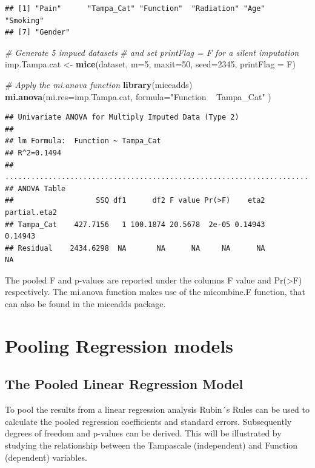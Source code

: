 \documentclass[]{book}
\newenvironment{Shaded}{\begin{snugshade}}{\end{snugshade}}
\newcommand{\KeywordTok}[1]{\textcolor[rgb]{0.13,0.29,0.53}{\textbf{#1}}}
\newcommand{\DataTypeTok}[1]{\textcolor[rgb]{0.13,0.29,0.53}{#1}}
\newcommand{\DecValTok}[1]{\textcolor[rgb]{0.00,0.00,0.81}{#1}}
\newcommand{\StringTok}[1]{\textcolor[rgb]{0.31,0.60,0.02}{#1}}
\newcommand{\CommentTok}[1]{\textcolor[rgb]{0.56,0.35,0.01}{\textit{#1}}}
\newcommand{\NormalTok}[1]{#1}
\theoremstyle{definition}
\theoremstyle{definition}
\theoremstyle{definition}
\theoremstyle{remark}
\begin{document}
\begin{verbatim}
## [1] "Pain"      "Tampa_Cat" "Function"  "Radiation" "Age"       "Smoking"  
## [7] "Gender"
\end{verbatim}

\begin{Shaded}
\begin{Highlighting}[]
\CommentTok{# Generate 5 impued datasets }
\CommentTok{# and set printFlag = F for a silent imputation}
\NormalTok{imp.Tampa.cat <-}\StringTok{ }\KeywordTok{mice}\NormalTok{(dataset, }\DataTypeTok{m=}\DecValTok{5}\NormalTok{, }\DataTypeTok{maxit=}\DecValTok{50}\NormalTok{, }\DataTypeTok{seed=}\DecValTok{2345}\NormalTok{, }\DataTypeTok{printFlag =}\NormalTok{ F)}
 
\CommentTok{# Apply the mi.anova function}
\KeywordTok{library}\NormalTok{(miceadds)}
\KeywordTok{mi.anova}\NormalTok{(}\DataTypeTok{mi.res=}\NormalTok{imp.Tampa.cat, }\DataTypeTok{formula=}\StringTok{"Function ~ Tampa_Cat"}\NormalTok{ )}
\end{Highlighting}
\end{Shaded}

\begin{verbatim}
## Univariate ANOVA for Multiply Imputed Data (Type 2)  
## 
## lm Formula:  Function ~ Tampa_Cat
## R^2=0.1494 
## ..........................................................................
## ANOVA Table 
##                   SSQ df1      df2 F value Pr(>F)    eta2 partial.eta2
## Tampa_Cat    427.7156   1 100.1874 20.5678  2e-05 0.14943      0.14943
## Residual    2434.6298  NA       NA      NA     NA      NA           NA
\end{verbatim}

The pooled F and p-values are reported under the columns F value and
Pr(\textgreater{}F) respectively. The mi.anova function makes use of the
micombine.F function, that can also be found in the miceadds package.

\section{Pooling Regression models}\label{pooling-regression-models}

\subsection{The Pooled Linear Regression
Model}\label{the-pooled-linear-regression-model}

To pool the results from a linear regression analysis Rubin´s Rules can
be used to calculate the pooled regression coefficients and standard
errors. Subsequently degrees of freedom and p-values can be derived.
This will be illustrated by studying the relationship between the
Tampascale (independent) and Function (dependent) variables.
\end{document}
